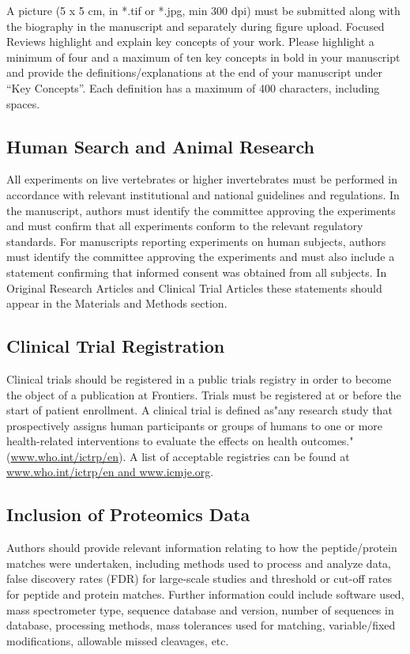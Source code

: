 \documentclass{frontiersMED} %
\begin{document}
A picture (5 x 5 cm, in *.tif or *.jpg, min 300 dpi) must be submitted along with the biography in the manuscript and separately during figure upload.
Focused Reviews highlight and explain key concepts of your work. Please highlight a minimum of four and a maximum of ten key concepts in bold in your manuscript and provide the definitions/explanations at the end of your manuscript under “Key Concepts”. Each definition has a maximum of 400 characters, including spaces.

\subsection{Human Search and Animal Research}

All experiments on live vertebrates or higher invertebrates must be performed in accordance with relevant institutional and national guidelines and regulations. In the manuscript, authors must identify the committee approving the experiments and must confirm that all experiments conform to the relevant regulatory standards. For manuscripts reporting experiments on human subjects, authors must identify the committee approving the experiments and must also include a statement confirming that informed consent was obtained from all subjects. In Original Research Articles and Clinical Trial Articles these statements should appear in the Materials and Methods section.

\subsection{Clinical Trial Registration}

Clinical trials should be registered in a public trials registry in order to become the object of a publication at Frontiers. Trials must be registered at or before the start of patient enrollment. A clinical trial is defined as"any research study that prospectively assigns human participants or groups of humans to one or more health-related interventions to evaluate the effects on health outcomes."(\url{www.who.int/ictrp/en}). A list of acceptable registries can be found at \url{www.who.int/ictrp/en and www.icmje.org}.

\subsection{Inclusion of Proteomics Data}

Authors should provide relevant information relating to how the peptide/protein matches were undertaken, including methods used to process and analyze data, false discovery rates (FDR) for large-scale studies and threshold or cut-off rates for peptide and protein matches. Further information could include software used, mass spectrometer type, sequence database and version, number of sequences in database, processing methods, mass tolerances used for matching, variable/fixed modifications, allowable missed cleavages, etc.
\end{document}
